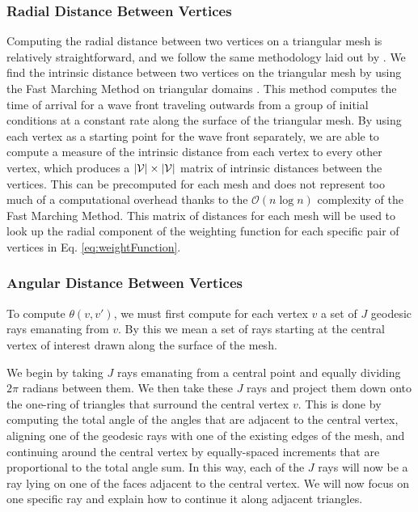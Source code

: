 \documentclass{article}
\DeclarePairedDelimiter\abs{\lvert}{\rvert}\DeclarePairedDelimiter\norm{\lVert}{\rVert}\newcommand{\p}[1]{\left(#1\right)}
\begin{document}
\subsubsection{Radial Distance Between Vertices}

Computing the radial distance between two vertices on a triangular mesh is relatively straightforward, and we follow the same methodology laid out by \citet{graphNN}. We find the intrinsic distance between two vertices on the triangular mesh by using the Fast Marching Method on triangular domains \citep{fmm,fmmGeo}. This method computes the time of arrival for a wave front traveling outwards from a group of initial conditions at a constant rate along the surface of the triangular mesh. By using each vertex as a starting point for the wave front separately, we are able to compute a measure of the intrinsic distance from each vertex to every other vertex, which produces a $\abs{\mathcal{V}} \times \abs{\mathcal{V}}$ matrix of intrinsic distances between the vertices. This can be precomputed for each mesh and does not represent too much of a computational overhead thanks to the $\mathcal{O}(n \log n)$ complexity of the Fast Marching Method. This matrix of distances for each mesh will be used to look up the radial component of the weighting function for each specific pair of vertices in Eq. \eqref{eq:weightFunction}.

\subsubsection{Angular Distance Between Vertices}

To compute $\theta(v,v')$, we must first compute for each vertex $v$ a set of $J$ geodesic rays emanating from $v$. By this we mean a set of rays starting at the central vertex of interest drawn along the surface of the mesh. 



\iftrue We begin by taking $J$ rays emanating from a central point and equally dividing $2\pi$ radians between them. We then take these $J$ rays and project them down onto the one-ring of triangles that surround the central vertex $v$. This is done by computing the total angle of the angles that are adjacent to the central vertex, aligning one of the geodesic rays with one of the existing edges of the mesh, and continuing around the central vertex by equally-spaced increments that are proportional to the total angle sum. In this way, each of the $J$ rays will now be a ray lying on one of the faces adjacent to the central vertex. We will now focus on one specific ray and explain how to continue it along adjacent triangles.
\end{document}
